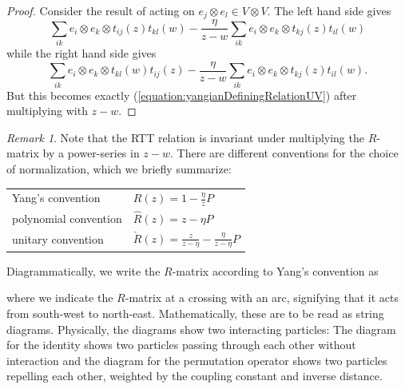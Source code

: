 \documentclass[11pt]{report}
\theoremstyle{definition}
\theoremstyle{remark}
\newtheorem*{remark}{Remark}
\theoremstyle{remark}
\begin{document}
\begin{proof}
Consider the result of acting on $e_j \otimes e_l \in V \otimes V$. The left hand side gives
\begin{equation*}
\sum_{ik} e_i \otimes e_k \otimes t_{ij}(z) t_{kl}(w) - \frac{\eta}{z-w} \sum_{ik} e_i \otimes e_k \otimes t_{kj}(z) t_{il}(w)
\end{equation*}
while the right hand side gives
\begin{equation*}
\sum_{ik} e_i \otimes e_k \otimes t_{kl}(w) t_{ij}(z) - \frac{\eta}{z-w} \sum_{ik} e_i \otimes e_k \otimes t_{kj}(z) t_{il}(w).
\end{equation*}
But this becomes exactly (\ref{equation:yangianDefiningRelationUV}) after multiplying with $z-w$.
\end{proof}

\begin{remark}
Note that the RTT relation is invariant under multiplying the $R$-matrix by a power-series in $z-w$. There are different conventions for the choice of normalization, which we briefly summarize:
\begin{center}
\begin{tabular}{|l||l|}
\hline
Yang's convention & $R(z) = 1 - \frac{\eta}{z} P$ \\
polynomial convention & $\hat R(z) = z - \eta P$ \\
unitary convention & $\check R(z) = \frac{z}{z-\eta} - \frac{\eta}{z-\eta} P$ \\
\hline
\end{tabular}
\end{center}
Diagrammatically, we write the $R$-matrix according to Yang's convention as
~\\
\begin{center}
\end{center}
where we indicate the $R$-matrix at a crossing with an arc, signifying that it acts from south-west to north-east. Mathematically, these are to be read as string diagrams. Physically, the diagrams show two interacting particles: The diagram for the identity shows two particles passing through each other without interaction and the diagram for the permutation operator shows two particles repelling each other, weighted by the coupling constant and inverse distance.


\end{remark}
\end{document}
